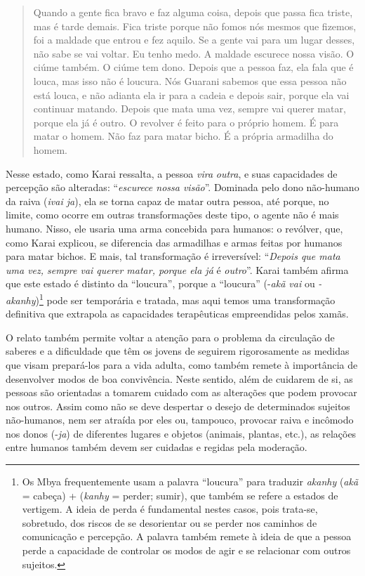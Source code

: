 \begin{quote}
Quando a gente fica bravo e faz alguma coisa, depois que passa fica
triste, mas é tarde demais. Fica triste porque não fomos nós mesmos que
fizemos, foi a maldade que entrou e fez aquilo. Se a gente vai para um
lugar desses, não sabe se vai voltar. Eu tenho medo. A maldade escurece
nossa visão. O ciúme também. O ciúme tem dono. Depois que a pessoa faz,
ela fala que é louca, mas isso não é loucura. Nós Guarani sabemos que
essa pessoa não está louca, e não adianta ela ir para a cadeia e depois
sair, porque ela vai continuar matando. Depois que mata uma vez, sempre
vai querer matar, porque ela já é outro. O revolver é feito para o
próprio homem. É para matar o homem. Não faz para matar bicho. É a
própria armadilha do homem.
\end{quote}

Nesse estado, como Karai ressalta, a pessoa \emph{vira} \emph{outra}, e
suas capacidades de percepção são alteradas: ``\emph{escurece nossa
visão}''. Dominada pelo dono não-humano da raiva (\emph{ivai ja}), ela
se torna capaz de matar outra pessoa, até porque, no limite, como ocorre
em outras transformações deste tipo, o agente não é mais humano. Nisso,
ele usaria uma arma concebida para humanos: o revólver, que, como Karai
explicou, se diferencia das armadilhas e armas feitas por humanos para
matar bichos. E mais, tal transformação é irreversível: ``\emph{Depois
que mata uma vez, sempre vai querer matar, porque ela já} é
\emph{outro}''. Karai também afirma que este estado é distinto da
``loucura'', porque a ``loucura'' (-\emph{akã vai} ou
\emph{-akanhy})\footnote{Os Mbya frequentemente usam a palavra
  ``loucura'' para traduzir \emph{akanhy} (\emph{akã} = cabeça) +
  (\emph{kanhy} = perder; sumir), que também se refere a estados de
  vertigem. A ideia de perda é fundamental nestes casos, pois trata-se,
  sobretudo, dos riscos de se desorientar ou se perder nos caminhos de
  comunicação e percepção. A palavra também remete à ideia de que a
  pessoa perde a capacidade de controlar os modos de agir e se
  relacionar com outros sujeitos.} pode ser temporária e tratada, mas
aqui temos uma transformação definitiva que extrapola as capacidades
terapêuticas empreendidas pelos xamãs.

O relato também permite voltar a atenção para o problema da circulação
de saberes e a dificuldade que têm os jovens de seguirem rigorosamente
as medidas que visam prepará-los para a vida adulta, como também remete
à importância de desenvolver modos de boa convivência. Neste sentido,
além de cuidarem de si, as pessoas são orientadas a tomarem cuidado com
as alterações que podem provocar nos outros. Assim como não se deve
despertar o desejo de determinados sujeitos não-humanos, nem ser atraída
por eles ou, tampouco, provocar raiva e incômodo nos donos (-\emph{ja})
de diferentes lugares e objetos (animais, plantas, etc.), as relações
entre humanos também devem ser cuidadas e regidas pela moderação.

